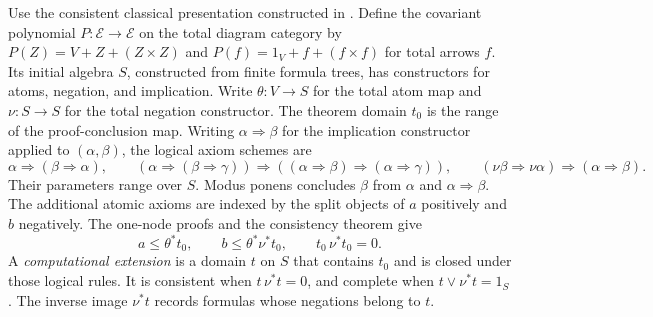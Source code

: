 \documentclass[11pt]{article}
\begin{document}
Use the consistent classical presentation constructed in
\cite[Theorem 6.3]{ThreePoint}. Define the covariant polynomial
$P:\mathcal E\to\mathcal E$ on the total diagram category by
$P(Z)=V+Z+(Z\times Z)$ and
$P(f)=1_V+f+(f\times f)$ for total arrows $f$.
Its initial algebra $S$, constructed from finite formula trees,
has constructors for atoms, negation, and implication.
Write $\theta:V\to S$ for the total atom map
and $\nu:S\to S$ for the total negation constructor.
The theorem domain $t_0$ is the range of the proof-conclusion map.
Writing $\alpha\Rightarrow\beta$ for the implication constructor
applied to $(\alpha,\beta)$, the logical axiom schemes are
\[
 \alpha\Rightarrow(\beta\Rightarrow\alpha),\qquad
 (\alpha\Rightarrow(\beta\Rightarrow\gamma))
   \Rightarrow((\alpha\Rightarrow\beta)\Rightarrow
                         (\alpha\Rightarrow\gamma)),\qquad
 (\nu\beta\Rightarrow\nu\alpha)\Rightarrow(\alpha\Rightarrow\beta).
\]
Their parameters range over $S$. Modus ponens concludes $\beta$
from $\alpha$ and $\alpha\Rightarrow\beta$.
The additional atomic axioms are indexed by the split objects
of $a$ positively and $b$ negatively.
The one-node proofs and the consistency theorem give
\begin{equation}\label{eq:atomic-inequalities}
 a\le\theta^*t_0,\qquad
 b\le\theta^*\nu^*t_0,\qquad t_0\,\nu^*t_0=0.
\end{equation}
A \emph{computational extension} is a domain $t$ on $S$ that
contains $t_0$ and is closed under those logical rules.
It is consistent when $t\,\nu^*t=0$, and complete when
$t\vee\nu^*t=1_S$. The inverse image $\nu^*t$ records formulas
whose negations belong to $t$.
\end{document}
